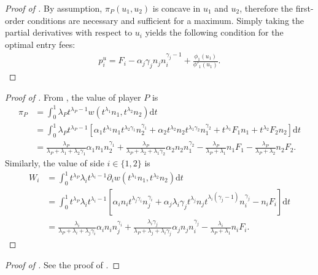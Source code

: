 \documentclass[a4paper]{article}
\newcommand{\dt}{\mathrm{d}t}
\begin{document}
\begin{proof}[Proof of ]
    By assumption, $\pi_P(u_1, u_2)$ is concave in $u_1$ and $u_2$, therefore the first-order conditions are necessary and sufficient for a maximum.
    Simply taking the partial derivatives with respect to $u_i$ yields the following condition for the optimal entry fees:
    \begin{align*}
        p_i^u = F_i - \alpha_j \gamma_j n_j n_i^{\gamma_j - 1} + \frac{\phi_1(u_1)}{\phi'_1(u_1)}.
    \end{align*}
\end{proof}

\begin{proof}[Proof of ]
    From , the value of player $P$ is
    \begin{align*}
        \pi_P &= \int_0^1 \lambda_P t^{\lambda_P - 1} w(t^{\lambda_1} n_1, t^{\lambda_2} n_2) \dt \\
        &= \int_0^1 \lambda_P t^{\lambda_P - 1} \left[ \alpha_1 t^{\lambda_1} n_1 t^{\lambda_2\gamma_1} n_2^{\gamma_1} + \alpha_2 t^{\lambda_2} n_2 t^{\lambda_1\gamma_2} n_1^{\gamma_2} + t^{\lambda_1} F_1 n_1 + t^{\lambda_2} F_2 n_2 \right] \dt \\
        &= \frac{\lambda_P}{\lambda_P + \lambda_1 + \lambda_2\gamma_1} \alpha_1 n_1 n_2^{\gamma_1} + \frac{\lambda_P}{\lambda_P + \lambda_2 + \lambda_1\gamma_2} \alpha_2 n_2 n_1^{\gamma_2} - \frac{\lambda_P}{\lambda_P + \lambda_1} n_1 F_1 - \frac{\lambda_P}{\lambda_P + \lambda_2} n_2 F_2.
    \end{align*}
    Similarly, the value of side $i \in \{1, 2\}$ is
    \begin{align*}
        W_i &= \int_0^1 t^{\lambda_P} \lambda_i t^{\lambda_i - 1} \partial_i w(t^{\lambda_1} n_1, t^{\lambda_2} n_2) \dt \\
        &= \int_0^1 t^{\lambda_P} \lambda_i t^{\lambda_i - 1} \left[ \alpha_i n_i t^{\lambda_j \gamma_i} n_j^{\gamma_i} + \alpha_j \lambda_i \gamma_j t^{\lambda_j} n_j t^{\lambda_i (\gamma_j - 1)} n_i^{\gamma_j} - n_i F_i \right] \dt \\
        &= \frac{\lambda_i}{\lambda_P + \lambda_i + \lambda_j\gamma_i} \alpha_i n_i n_j^{\gamma_i} + \frac{\lambda_i \gamma_j}{\lambda_P + \lambda_j + \lambda_i\gamma_j} \alpha_j n_j n_i^{\gamma_j} - \frac{\lambda_i}{\lambda_P + \lambda_1} n_i F_i.
    \end{align*}
\end{proof}

\begin{proof}[Proof of ]
    See the proof of .
\end{proof}
\end{document}
